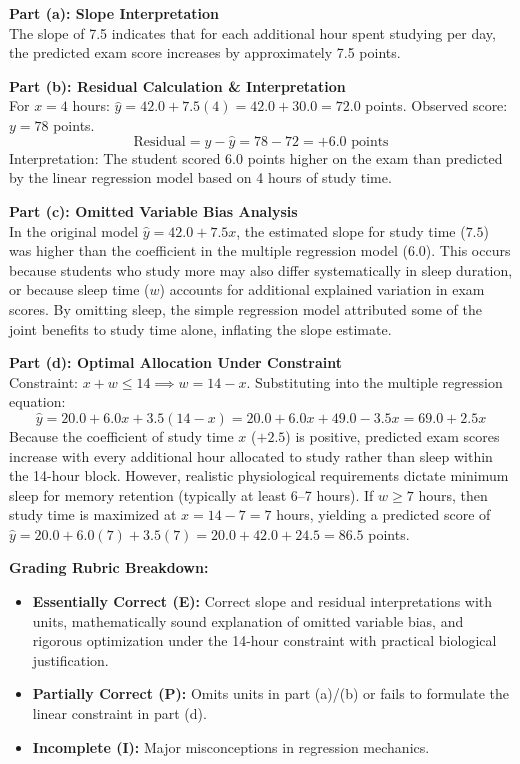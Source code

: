 \begin{frqrubricbox}
\textbf{Part (a): Slope Interpretation}\\
The slope of 7.5 indicates that for each additional hour spent studying per day, the predicted exam score increases by approximately 7.5 points.

\textbf{Part (b): Residual Calculation \& Interpretation}\\
For $x = 4$ hours: $\hat{y} = 42.0 + 7.5(4) = 42.0 + 30.0 = 72.0$ points.
Observed score: $y = 78$ points.
\[ \text{Residual} = y - \hat{y} = 78 - 72 = +6.0\text{ points} \]
Interpretation: The student scored 6.0 points higher on the exam than predicted by the linear regression model based on 4 hours of study time.

\textbf{Part (c): Omitted Variable Bias Analysis}\\
In the original model $\hat{y} = 42.0 + 7.5x$, the estimated slope for study time ($7.5$) was higher than the coefficient in the multiple regression model ($6.0$). This occurs because students who study more may also differ systematically in sleep duration, or because sleep time ($w$) accounts for additional explained variation in exam scores. By omitting sleep, the simple regression model attributed some of the joint benefits to study time alone, inflating the slope estimate.

\textbf{Part (d): Optimal Allocation Under Constraint}\\
Constraint: $x + w \le 14 \implies w = 14 - x$.
Substituting into the multiple regression equation:
\[ \hat{y} = 20.0 + 6.0x + 3.5(14 - x) = 20.0 + 6.0x + 49.0 - 3.5x = 69.0 + 2.5x \]
Because the coefficient of study time $x$ ($+2.5$) is positive, predicted exam scores increase with every additional hour allocated to study rather than sleep within the 14-hour block. However, realistic physiological requirements dictate minimum sleep for memory retention (typically at least 6--7 hours). If $w \ge 7$ hours, then study time is maximized at $x = 14 - 7 = 7$ hours, yielding a predicted score of $\hat{y} = 20.0 + 6.0(7) + 3.5(7) = 20.0 + 42.0 + 24.5 = 86.5$ points.

\textbf{Grading Rubric Breakdown:}\\
\begin{itemize}
  \item \textbf{Essentially Correct (E):} Correct slope and residual interpretations with units, mathematically sound explanation of omitted variable bias, and rigorous optimization under the 14-hour constraint with practical biological justification.
  \item \textbf{Partially Correct (P):} Omits units in part (a)/(b) or fails to formulate the linear constraint in part (d).
  \item \textbf{Incomplete (I):} Major misconceptions in regression mechanics.
\end{itemize}
\end{frqrubricbox}
